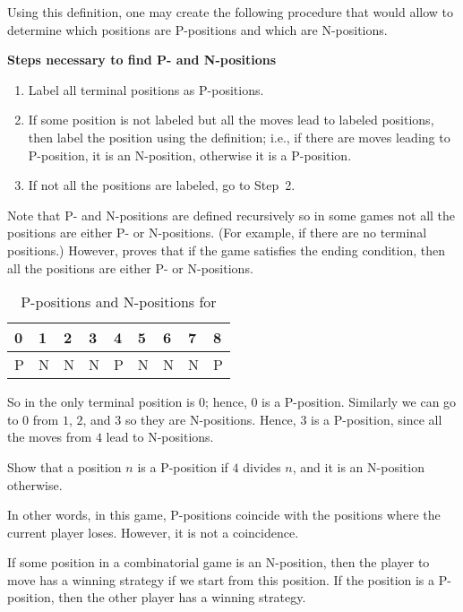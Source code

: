 Using this definition, one may create the following procedure that would allow
to determine which positions are P-positions and which are N-positions.
\begin{template}
  \textbf{Steps necessary to find P- and N-positions} \\

  \begin{enumerate}
    \item Label all terminal positions as P-positions.
    \item If some position is not labeled but all the moves lead to labeled
      positions, then label the position using the definition; i.e., if there
      are moves leading to P-position, it is an N-position, otherwise it is a
      P-position.
    \item If not all the positions are labeled, go to Step~2.
  \end{enumerate}
\end{template}


Note that P- and N-positions are defined recursively so in some games not all
the positions are either P- or N-positions. (For example, if there are no
terminal positions.) However, 
proves that if the game satisfies the ending condition, then all the positions
are either P- or N-positions.


\begin{table}[h!]
  \centering
  \begin{tabular}{l l l l l l l l l}
      \toprule
      0 & 1 & 2 & 3 & 4 & 5 & 6 & 7 & 8 \\
      \midrule
      P & N & N & N & P & N & N & N & P \\
      \bottomrule
  \end{tabular}
  \caption{P-positions and N-positions for }
  \label{table:take-away-21-3-2-1}
\end{table}


So in  the only terminal position is $0$;
hence, $0$ is a P-position. Similarly we can go to $0$ from $1$, $2$, and
$3$ so they are N-positions. Hence, $3$ is a P-position,
since all the moves from $4$ lead to N-positions.
\begin{exercise}
  Show that a position $n$ is a P-position if $4$ divides $n$, and
  it is an N-position otherwise.
\end{exercise}

In other words, in this game, P-positions coincide with the positions where the
current player loses. However, it is not a coincidence.
\begin{theorem}
  If some position in a combinatorial game is an N-position, then the player to
  move has a winning strategy if we start from this position. If the position
  is a P-position, then the other player has a winning strategy.
\end{theorem}

